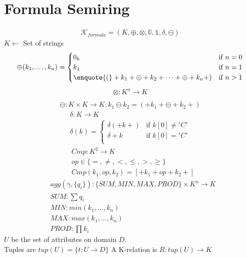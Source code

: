 \documentclass{article}
\newcommand{\dq}[1]{\text{\enquote{#1}}}
\begin{document}
\section{Formula Semiring}
\begin{align*}
  \mathcal{K}_{formula} = (K, \oplus, \otimes, \mathbb{0}, \mathbb{1}, \delta, \ominus)
\end{align*}
$K \leftarrow$ Set of strings\\
\begin{align*}
\oplus (k_1,\dots, k_n) = \begin{cases}
    0_k & \text{if } n = 0\\
    k_1 & \text{if } n = 1\\
    \dq{(}+k_1 + \oplus + k_2 + \dots + \oplus + k_n +) & \text{if } n > 1  
\end{cases}
\end{align*}
\begin{align*}
  \otimes: K^n \rightarrow K \\
\end{align*}
\begin{align*}
  \ominus: K\times K \rightarrow K: k_1 \ominus k_2 = (+k_1+ \ominus +k_2+)
\end{align*} 
\begin{align*}
\delta: K \rightarrow K\\
\delta(k) = \begin{cases}
    \delta(+k+) & \text{if } k[0] \neq 'C'\\
    \delta +k & \text{if } k[0] = 'C'\\
    \end{cases}
\end{align*}
\begin{align*}
  &Cmp: K^2 \rightarrow K\\
  &op\in\{=,\neq, <, \leq, >, \geq\}\\
  &Cmp(k_1, op, k_2) = [+k_1 + op + k_2 +]
\end{align*}
\begin{align*}
&agg(\gamma, \{q_i\}): \{SUM, MIN, MAX, PROD\}\times K^n \rightarrow K\\
&SUM: \sum q_i\\
&MIN: min(k_1, \dots, k_n)\\
&MAX: max(k_1, \dots, k_n)\\
&PROD: \prod k_i
\end{align*}
$U$ be the set of attributes on domain $D$.\\
Tuples are $tup(U) = \{t: U \rightarrow D\}$
A K-relation is $R: tup(U) \rightarrow K$
\end{document}
